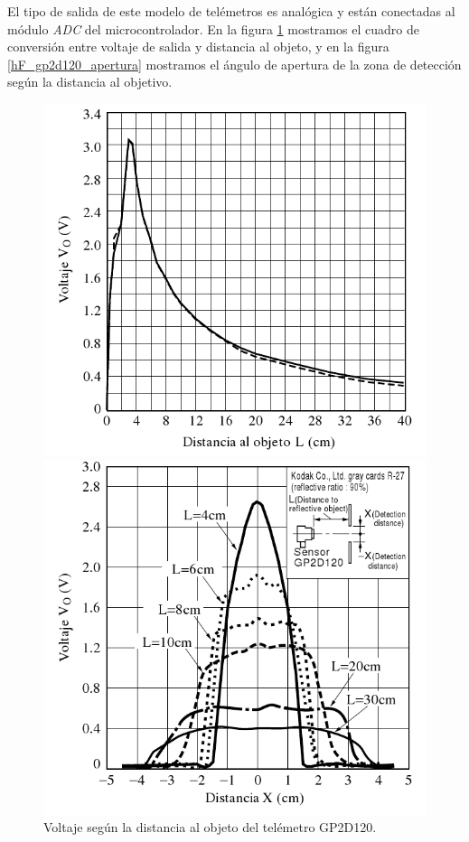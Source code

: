 El tipo de salida de este modelo de tel\'emetros es anal\'ogica y est\'an conectadas al m\'odulo \emph{ADC} del microcontrolador.
En la figura \ref{hF_gp2d120_distancia} mostramos el cuadro de conversi\'on entre voltaje de salida y distancia al objeto, y en la figura
\ref{hF_gp2d120_apertura} mostramos el \'angulo de apertura de la zona de detecci\'on seg\'un la distancia al objetivo.

\begin{figure}[h]
	\begin{minipage}[b]{0.5\linewidth}
		\centering
		\includegraphics[scale=0.25]{figuras/tel-VxL.png}
		\caption{Voltaje seg\'un la distancia al objeto del tel\'emetro GP2D120.}
		\label{hF_gp2d120_distancia}
	\end{minipage}
	\begin{minipage}[b]{0.5\linewidth}
		\centering
		\includegraphics[scale=0.25]{figuras/tel-VxX.png}

\end{minipage}
\end{figure}
